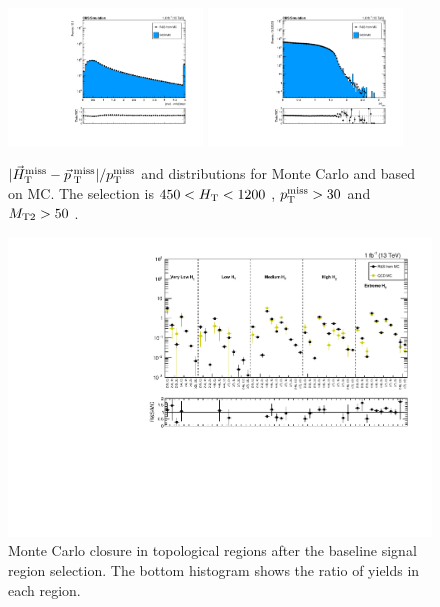 \begin{figure}[htbp]
  \begin{center}
    \includegraphics[width=0.46\textwidth]{figs/qcd/rs_mc/lowht_diffMetMhtOverMet.pdf}
    \includegraphics[width=0.46\textwidth]{figs/qcd/rs_mc/lowht_deltaPhiMin.pdf}
    \caption{$|\vec{H}_{\mathrm{T}}^{\mathrm{miss}}-\vec{p}_{\> \mathrm{T}}^{\> \mathrm{miss}}|/p_{\mathrm{T}}^{\mathrm{miss}}$ and \dphimet distributions for Monte Carlo and \rs based on MC. The selection is $450 < H_{\mathrm{T}} < 1200$ \GeV, $p_{\mathrm{T}}^{\mathrm{miss}} > 30$ \GeV and $M_{\mathrm{T2}} > 50$ \GeV.
            }
    \label{Fig:rs_mc_deltaphi_lowht}
  \end{center}
\end{figure}

\begin{figure}[htbp]
  \begin{center}
    \includegraphics[width=1.0\textwidth]{figs/qcd/rs_mc/mc_comp_sr_ratio.pdf}
    \caption{\rs Monte Carlo closure in topological regions after the baseline signal region selection. The bottom histogram shows the ratio of yields in each region.
            }
    \label{Fig:rs_mc_comp_sr_ratio}
  \end{center}
\end{figure}

